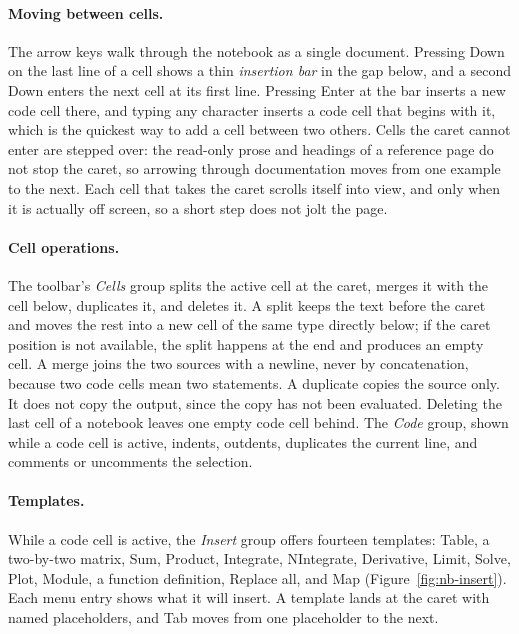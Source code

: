 \paragraph{Moving between cells.} The arrow keys walk through the notebook
as a single document. Pressing Down on the last
line of a cell shows a thin \emph{insertion bar} in the gap below, and a second Down enters the next cell
at its first line. Pressing Enter at the bar inserts a new code cell there,
and typing any character inserts a code cell that begins with it, which is
the quickest way to add a cell between two others. Cells the caret cannot
enter are stepped over: the read-only prose and headings of a reference page
do not stop the caret, so arrowing through documentation moves from one
example to the next. Each cell that takes the caret scrolls itself into view,
and only when it is actually off screen, so a short step does not jolt the
page.

\paragraph{Cell operations.} The toolbar's \emph{Cells} group splits the
active cell at the caret, merges it with the cell below, duplicates it, and
deletes it. A split keeps the text before the caret and moves the rest into
a new cell of the same type directly below; if the caret position is not
available, the split happens at the end and produces an empty cell. A merge
joins the two sources with a newline, never by concatenation, because two
code cells mean two statements. A duplicate copies the source only. It does
not copy the output, since the copy has not been evaluated. Deleting the last
cell of a notebook leaves one empty code cell behind. The \emph{Code} group,
shown while a code cell is active, indents, outdents, duplicates the current
line, and comments or uncomments the selection.

\paragraph{Templates.} While a code cell is active, the \emph{Insert} group
offers fourteen templates: Table, a two-by-two matrix, Sum, Product,
Integrate, NIntegrate, Derivative, Limit, Solve, Plot, Module, a function
definition, Replace all, and Map (Figure~\ref{fig:nb-insert}). Each menu entry
shows what it will insert. A template lands at the caret with named
placeholders, and Tab moves from one placeholder to the next.%

